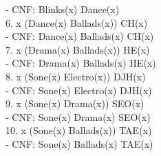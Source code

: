 \documentclass{article}
\begin{document}
\: \: \: \: - CNF: \neg Blinks(x) \vee Dance(x)\\

6. \forall x \: (Dance(x) \wedge Ballads(x)) \Rightarrow CH(x)\\

\: \: \: \: - CNF: \neg Dance(x) \vee \neg Ballads(x) \vee CH(x)\\

7. \forall x \: (Drama(x) \wedge Ballads(x)) \Rightarrow HE(x)\\

\: \: \: \: - CNF: \neg Drama(x) \vee \neg Ballads(x) \vee HE(x)\\

8. \forall x \: (Sone(x) \wedge Electro(x)) \Rightarrow DJH(x)\\

\: \: \: \: - CNF: \neg Sone(x) \vee \neg Electro(x) \vee DJH(x)\\

9. \forall x \: (Sone(x) \wedge Drama(x)) \Rightarrow SEO(x)\\

\: \: \: \: - CNF: \neg Sone(x) \vee \neg Drama(x) \vee SEO(x)\\

10. \forall x \: (Sone(x) \wedge Ballads(x)) \Rightarrow TAE(x)\\

\: \: \: \: - CNF: \neg Sone(x) \vee \neg Ballads(x) \vee TAE(x)\\
\end{document}
